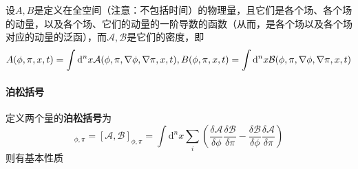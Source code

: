 \documentclass[UTF8, a4paper]{ctexart}
\begin{document}
设$A, B$是定义在全空间（注意：不包括时间）的物理量，且它们是各个场、各个场的动量，以及各个场、它们的动量的一阶导数的函数（从而，是各个场以及各个场对应的动量的泛函），而$\mathcal{A}, \mathcal{B}$是它们的密度，即
\begin{equation}
    A(\phi, \pi, x, t) = \int \mathrm{d}^n x \mathcal{A}(\phi, \pi, \nabla \phi, \nabla \pi, x, t), \\
    B(\phi, \pi, x, t) = \int \mathrm{d}^n x \mathcal{B}(\phi, \pi, \nabla \phi, \nabla \pi, x, t)
\end{equation}

\paragraph{泊松括号} 定义两个量的\textbf{泊松括号}为
\begin{equation}
    [A, B]_{\phi, \pi} = [\mathcal{A}, \mathcal{B}]_{\phi, \pi} = \int \mathrm{d}^n x \sum_i \left(
    \frac{\delta \mathcal{A}}{\delta \phi} \frac{\delta \mathcal{B}}{\delta \pi} - \frac{\delta \mathcal{B}}{\delta \phi} \frac{\delta \mathcal{A}}{\delta \pi}
    \right) 
    \label{eq:poison-bracket-def}
\end{equation}
则有基本性质
\end{document}
